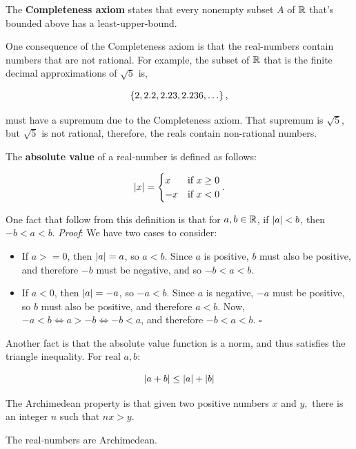 \documentclass{article}
\begin{document}
The \textbf{Completeness axiom} states that every nonempty \@{subset} $A$ of $\mathbb{R}$ that's bounded above has a \@{least-upper-bound}.

One consequence of the Completeness axiom is that the \@{real-numbers} contain numbers that are not \@{rational}. For example, the subset of $\mathbb{R}$ that is the finite decimal approximations of $\sqrt{5}$ is,

\[ \set{2, 2.2, 2.23, 2.236, \dots}, \]

must have a \@{supremum} due to the Completeness axiom. That supremum is $\sqrt{5}$, but $\sqrt{5}$ is not rational, therefore, the \@{reals} contain non-rational numbers.

The \textbf{absolute value} of a \@{real-number} is defined as follows:

\[ \left| x \right| = \begin{cases} x & \text{if } x \geq 0 \\ -x & \text{if } x < 0 \end{cases}. \]

One fact that follow from this definition is that for $a, b \in \mathbb{R}$, if $\left| a \right| < b$, then $-b < a < b$. \emph{Proof}: We have two cases to consider:

\begin{itemize}
\item If $a >= 0$, then $\left| a \right| = a$, so $a < b$. Since $a$ is positive, $b$ must also be positive, and therefore $-b$ must be negative, and so $-b < a < b$.
\end{itemize}

\begin{itemize}
\item If $a < 0$, then $\left| a \right| = -a$, so $-a < b$. Since $a$ is negative, $-a$ must be positive, so $b$ must also be positive, and therefore $a < b$. Now, $-a < b \iff a > -b \iff -b < a$, and therefore $-b < a < b.$ $\square$
\end{itemize}

Another fact is that the absolute value function is a \@{norm}, and thus satisfies the triangle inequality. For real $a, b$:

\[ \left| a + b \right| \leq \left| a \right| + \left| b \right| \]

\begin{definition}[Archimedean]
The Archimedean property is that given two positive numbers $x$ and $y,$ there is an \@{integer} $n$ such that $nx > y.$
\end{definition}

\begin{theorem}\label{reals-are-archimedean}
The \@{real-numbers} are \@{Archimedean}.
\end{theorem}
\end{document}
